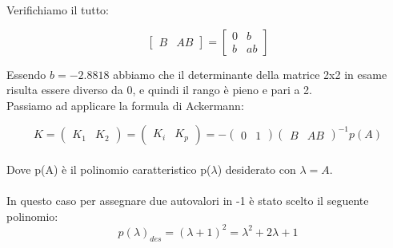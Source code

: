 \documentclass[a4paper,13pt]{article}
\begin{document}
	Verifichiamo il tutto:
	
\begin{equation*}
\begin{bmatrix}

	B&AB

\end{bmatrix} =              %
\begin{bmatrix}

	0&b\\b&ab

\end{bmatrix}
\end{equation*}

	Essendo $b=-2.8818$ abbiamo che il determinante della matrice  2x2 in esame risulta essere diverso da 0,
	e quindi il rango è pieno e pari a 2.\\
	Passiamo ad applicare la formula di Ackermann:
	
\begin{equation*}                    %
	K=
\begin{pmatrix}

	K_{1}&K_{2}

\end{pmatrix} =						%
\begin{pmatrix}

	K_{i}&K_{p}						

\end{pmatrix} = -					%
\begin{pmatrix}

	0&1						

\end{pmatrix}
\begin{pmatrix}

	B&AB					

\end{pmatrix}^{-1}p(A)
\end{equation*} \\

		Dove p(A) è il polinomio caratteristico p($\lambda$) desiderato con $\lambda=A$.\\\\
	In questo caso per assegnare due autovalori in -1 è stato scelto il seguente polinomio:\\

\begin{equation*}
	p(\lambda)_{des}=(\lambda+1)^{2}=\lambda^{2}+2\lambda+1        %
\end{equation*} \\
	
\end{document}
